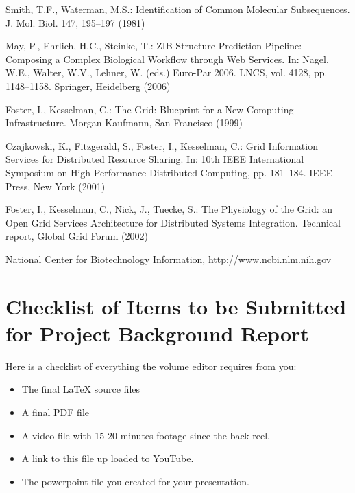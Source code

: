\documentclass[runningheads]{llncs}
\begin{document}
\begin{thebibliography}{4}

 Smith, T.F., Waterman, M.S.: Identification of Common Molecular
Subsequences. J. Mol. Biol. 147, 195--197 (1981)

 May, P., Ehrlich, H.C., Steinke, T.: ZIB Structure Prediction Pipeline:
Composing a Complex Biological Workflow through Web Services. In: Nagel,
W.E., Walter, W.V., Lehner, W. (eds.) Euro-Par 2006. LNCS, vol. 4128,
pp. 1148--1158. Springer, Heidelberg (2006)

 Foster, I., Kesselman, C.: The Grid: Blueprint for a New Computing
Infrastructure. Morgan Kaufmann, San Francisco (1999)

 Czajkowski, K., Fitzgerald, S., Foster, I., Kesselman, C.: Grid
Information Services for Distributed Resource Sharing. In: 10th IEEE
International Symposium on High Performance Distributed Computing, pp.
181--184. IEEE Press, New York (2001)

 Foster, I., Kesselman, C., Nick, J., Tuecke, S.: The Physiology of the
Grid: an Open Grid Services Architecture for Distributed Systems
Integration. Technical report, Global Grid Forum (2002)

 National Center for Biotechnology Information, \url{http://www.ncbi.nlm.nih.gov}

\end{thebibliography}



\section{Checklist of Items to be Submitted for Project Background Report}
Here is a checklist of everything the volume editor requires from you:


\begin{itemize}
\settowidth{\leftmargin}{{\Large$\square$}}\advance\leftmargin{}
\itemsep8pt\relax
\renewcommand\labelitemi{{\lower1.5pt\hbox{\Large$\square$}}}

\item The final \LaTeX{} source files
\item A final PDF file
\item A video file with 15-20 minutes footage since the back reel.
\item A link to this file up loaded to YouTube.
\item The powerpoint file you created for your presentation.
\end{itemize}
\end{document}
